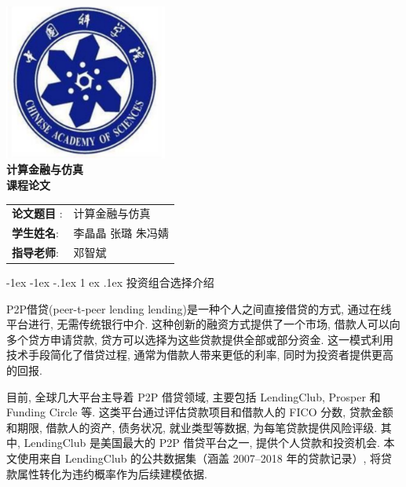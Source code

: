 \documentclass[12pt,nonblindrev]{write_paper}
\makeatletter
\renewcommand\section{\@startsection {section}{1}{\z@}%
                                   {-1ex \@plus -1ex \@minus -.1ex}%
                                   {1 ex \@plus.1ex}%
                                   {\normalfont\large\bfseries}}
\makeatother
\begin{document}
\vspace*{\fill}

\begin{center}

    \includegraphics[width=0.4\textwidth]{Figures/校徽.png}\\[1cm]
       \Huge \bfseries
       \textbf{计算金融与仿真}\\[0.5cm]
       \Huge \bfseries
       \textbf{课程论文}\\[2cm]
    
    \Large
    \begin{table}[htbp]
    \centering
    \Large
    \begin{tabular}{ll}
    \textbf{论文题目 }: & 计算金融与仿真 \\
    \textbf{学生姓名}: & 李晶晶 \quad 张璐 \quad 朱冯婧 \\
    \textbf{指导老师}: & 邓智斌 
    \end{tabular}
    \end{table}

    


\end{center}

\vspace*{\fill}
\newpage





\section{投资组合选择介绍}


P2P借贷(peer-t-peer lending lending)是一种个人之间直接借贷的方式, 通过在线平台进行, 无需传统银行中介. 这种创新的融资方式提供了一个市场, 借款人可以向多个贷方申请贷款, 贷方可以选择为这些贷款提供全部或部分资金. 这一模式利用技术手段简化了借贷过程, 通常为借款人带来更低的利率, 同时为投资者提供更高的回报. 

目前, 全球几大平台主导着 P2P 借贷领域, 主要包括 LendingClub, Prosper 和 Funding Circle 等. 这类平台通过评估贷款项目和借款人的 FICO 分数, 贷款金额和期限, 借款人的资产, 债务状况, 就业类型等数据, 为每笔贷款提供风险评级. 其中, LendingClub 是美国最大的 P2P 借贷平台之一, 提供个人贷款和投资机会. 本文使用来自 LendingClub 的公共数据集（涵盖 2007--2018 年的贷款记录）, 将贷款属性转化为违约概率作为后续建模依据. 
\end{document}
